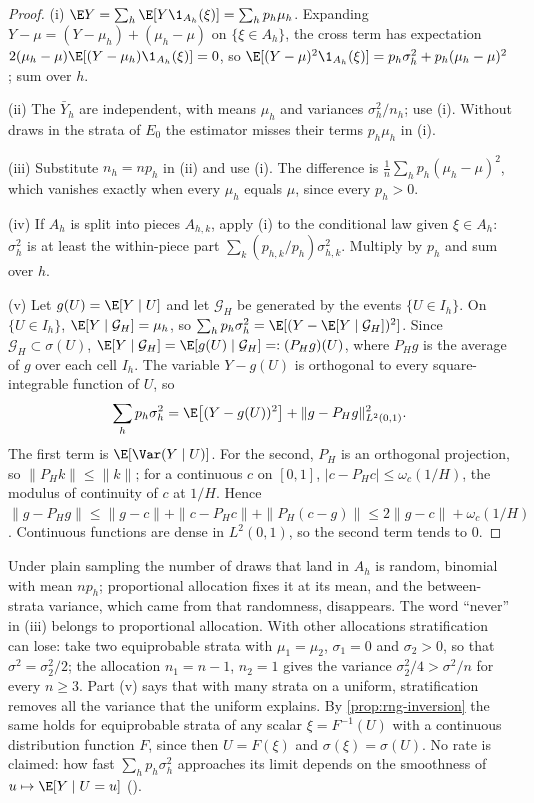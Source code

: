 \begin{proof}
(i) $\E Y=\sum_h\E[Y\1_{A_h}(\xi)]=\sum_hp_h\mu_h$. Expanding $Y-\mu=(Y-\mu_h)+(\mu_h-\mu)$ on
$\{\xi\in A_h\}$, the cross term has expectation
$2(\mu_h-\mu)\E[(Y-\mu_h)\1_{A_h}(\xi)]=0$, so
$\E[(Y-\mu)^2\1_{A_h}(\xi)]=p_h\sigma_h^2+p_h(\mu_h-\mu)^2$; sum over $h$.

(ii) The $\bar Y_h$ are independent, with means $\mu_h$ and variances $\sigma_h^2/n_h$; use
(i). Without draws in the strata of $E_0$ the estimator misses their terms $p_h\mu_h$ in (i).

(iii) Substitute $n_h=np_h$ in (ii) and use (i). The difference is
$\frac1n\sum_hp_h(\mu_h-\mu)^2$, which vanishes exactly when every $\mu_h$ equals $\mu$,
since every $p_h>0$.

(iv) If $A_h$ is split into pieces $A_{h,k}$, apply (i) to the conditional law given
$\xi\in A_h$: $\sigma_h^2$ is at least the within-piece part
$\sum_k(p_{h,k}/p_h)\sigma_{h,k}^2$. Multiply by $p_h$ and sum over $h$.

(v) Let $g(U)=\E[Y\mid U]$ and let $\mathcal G_H$ be generated by the events
$\{U\in I_h\}$. On $\{U\in I_h\}$, $\E[Y\mid\mathcal G_H]=\mu_h$, so
$\sum_hp_h\sigma_h^2=\E[(Y-\E[Y\mid\mathcal G_H])^2]$. Since $\mathcal G_H\subset\sigma(U)$,
$\E[Y\mid\mathcal G_H]=\E[g(U)\mid\mathcal G_H]=:(P_Hg)(U)$, where $P_Hg$ is the average of $g$
over each cell $I_h$. The variable $Y-g(U)$ is orthogonal to every square-integrable function of $U$, so
\[
  \sum_hp_h\sigma_h^2=\E\big[(Y-g(U))^2\big]+\|g-P_Hg\|^2_{L^2(0,1)} .
\]
The first term is $\E[\Var(Y\mid U)]$. For the second, $P_H$ is an orthogonal projection, so
$\|P_Hk\|\le\|k\|$; for a continuous $c$ on $[0,1]$, $|c-P_Hc|\le\omega_c(1/H)$, the modulus
of continuity of $c$ at $1/H$. Hence
$\|g-P_Hg\|\le\|g-c\|+\|c-P_Hc\|+\|P_H(c-g)\|\le2\|g-c\|+\omega_c(1/H)$. Continuous functions
are dense in $L^2(0,1)$, so the second term tends to $0$.
\end{proof}

Under plain sampling the number of draws that land in $A_h$ is random, binomial with
mean $np_h$; proportional allocation fixes it at its mean, and the between-strata variance,
which came from that randomness, disappears. The word ``never'' in (iii) belongs to
proportional allocation. With other allocations stratification can lose: take two
equiprobable strata with $\mu_1=\mu_2$, $\sigma_1=0$ and $\sigma_2>0$, so that
$\sigma^2=\sigma_2^2/2$; the allocation $n_1=n-1$, $n_2=1$ gives the variance
$\sigma_2^2/4>\sigma^2/n$ for every $n\ge3$. Part (v) says that with many strata on a uniform,
stratification removes all the variance that the uniform explains. By
\cref{prop:rng-inversion} the same holds for equiprobable strata of any scalar $\xi=F^{-1}(U)$
with a continuous distribution function $F$, since then $U=F(\xi)$ and $\sigma(\xi)=\sigma(U)$. No rate is
claimed: how fast $\sum_hp_h\sigma_h^2$ approaches its limit depends on the smoothness of
$u\mapsto\E[Y\mid U=u]$ ().


